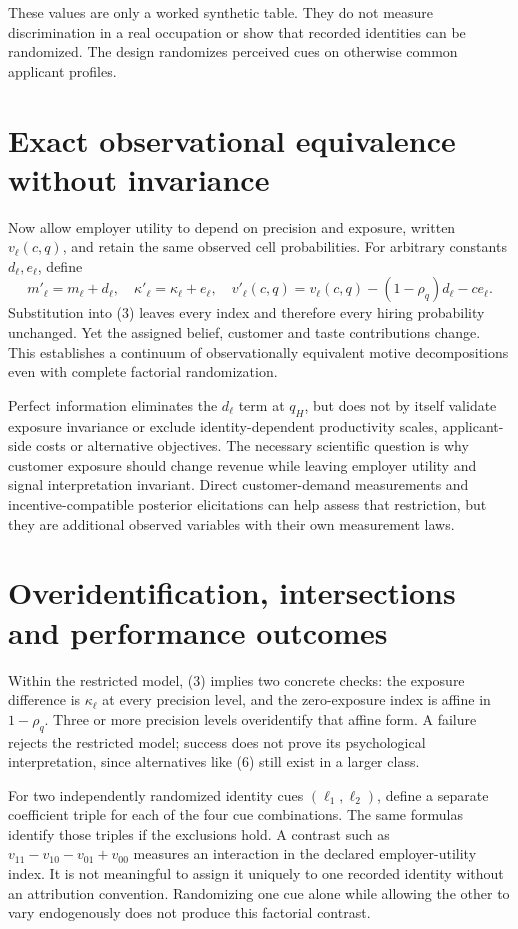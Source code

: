 \documentclass[11pt,a4paper]{article}
\begin{document}
These values are only a worked synthetic table. They do not measure discrimination in a real occupation or show that recorded identities can be randomized. The design randomizes perceived cues on otherwise common applicant profiles.

\section{Exact observational equivalence without invariance}
Now allow employer utility to depend on precision and exposure, written $v_\ell(c,q)$, and retain the same observed cell probabilities. For arbitrary constants $d_\ell,e_\ell$, define
\[
 m'_\ell=m_\ell+d_\ell,\quad
 \kappa'_\ell=\kappa_\ell+e_\ell,\quad
 v'_\ell(c,q)=v_\ell(c,q)-(1-\rho_q)d_\ell-ce_\ell.         \tag{6}
\]
Substitution into (3) leaves every index and therefore every hiring probability unchanged. Yet the assigned belief, customer and taste contributions change. This establishes a continuum of observationally equivalent motive decompositions even with complete factorial randomization.

Perfect information eliminates the $d_\ell$ term at $q_H$, but does not by itself validate exposure invariance or exclude identity-dependent productivity scales, applicant-side costs or alternative objectives. The necessary scientific question is why customer exposure should change revenue while leaving employer utility and signal interpretation invariant. Direct customer-demand measurements and incentive-compatible posterior elicitations can help assess that restriction, but they are additional observed variables with their own measurement laws.

\section{Overidentification, intersections and performance outcomes}
Within the restricted model, (3) implies two concrete checks: the exposure difference is $\kappa_\ell$ at every precision level, and the zero-exposure index is affine in $1-\rho_q$. Three or more precision levels overidentify that affine form. A failure rejects the restricted model; success does not prove its psychological interpretation, since alternatives like (6) still exist in a larger class.

For two independently randomized identity cues $(\ell_1,\ell_2)$, define a separate coefficient triple for each of the four cue combinations. The same formulas identify those triples if the exclusions hold. A contrast such as
$v_{11}-v_{10}-v_{01}+v_{00}$ measures an interaction in the declared employer-utility index. It is not meaningful to assign it uniquely to one recorded identity without an attribution convention. Randomizing one cue alone while allowing the other to vary endogenously does not produce this factorial contrast.
\end{document}
